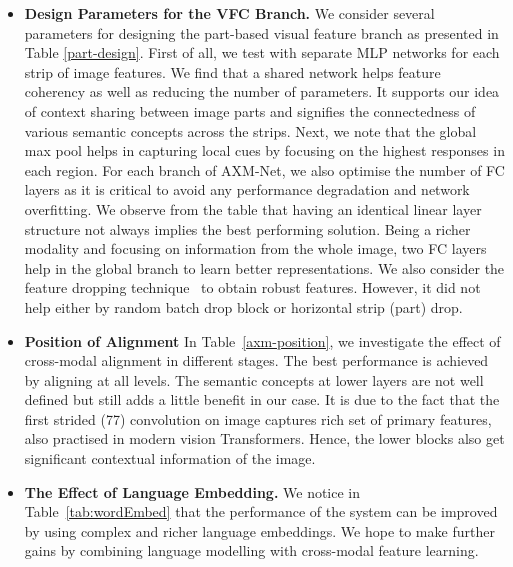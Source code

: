 \documentclass[letterpaper]{article} \usepackage{aaai22}  \usepackage{times}  \usepackage{helvet}  \usepackage{courier}  \usepackage[hyphens]{url}  \usepackage{graphicx} \urlstyle{rm} \def\UrlFont{\rm}  \usepackage{natbib}  \usepackage{caption} \DeclareCaptionStyle{ruled}{labelfont=normalfont,labelsep=colon,strut=off} \frenchspacing  \setlength{\pdfpagewidth}{8.5in}  \setlength{\pdfpageheight}{11in}  \usepackage{algorithm}
\begin{document}
\begin{itemize}
    \item \textbf{Design Parameters for the VFC Branch.}
    We consider several parameters for designing the part-based visual feature branch as presented in Table \ref{part-design}. First of all, we test with separate MLP networks for each strip of image features. We find that a shared network helps feature coherency as well as reducing the number of parameters. It supports our idea of context sharing between image parts and signifies the connectedness of various semantic concepts across the strips. Next, we note that the global max pool helps in capturing local cues by focusing on the highest responses in each region. For each branch of AXM-Net, we also optimise the number of FC layers as it is critical to avoid any performance degradation and network overfitting. We observe from the table that having an identical linear layer structure not always implies the best performing solution. Being a richer modality and focusing on information from the whole image, two FC layers help in the global branch to learn better representations. We also consider the feature dropping technique~\cite{dai2019batch} to obtain robust features. However, it did not help either by random batch drop block or horizontal strip (part) drop. 
    \item \textbf{Position of Alignment} In Table~\ref{axm-position}, we investigate the effect of cross-modal alignment in different stages. The best performance is achieved by aligning at all levels. The semantic concepts at lower layers are not well defined but still adds a little benefit in our case. It is due to the fact that the first strided (77) convolution on image captures rich set of primary features, also practised in modern vision Transformers. Hence, the lower blocks also get significant contextual information of the image. 
\begin{table}[!htbp]
\center 
{}
\caption{Effect of implicit alignment in different blocks.}
\label{axm-position}
\end{table}

    \item \textbf{The Effect of Language Embedding.} We notice in Table~\ref{tab:wordEmbed} that the performance of the system can be improved by using complex and richer language embeddings. We hope to make further gains by combining language modelling with cross-modal feature learning.
    \end{itemize}
\end{document}
